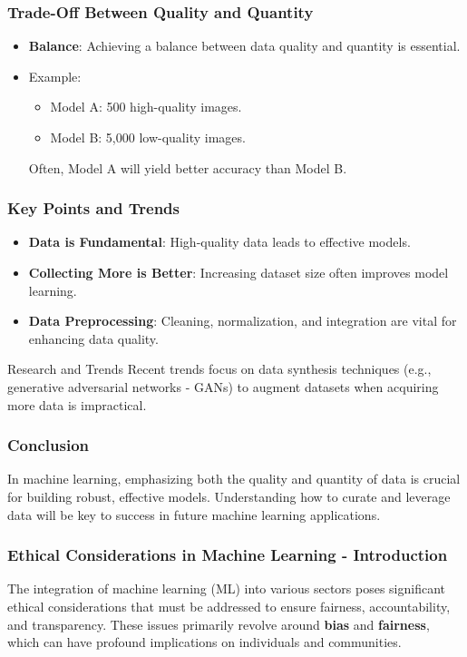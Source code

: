 \documentclass[aspectratio=169]{beamer}
\begin{document}
\begin{frame}[fragile]
    \frametitle{Trade-Off Between Quality and Quantity}
    \begin{itemize}
        \item \textbf{Balance}: Achieving a balance between data quality and quantity is essential.
        \item Example:
            \begin{itemize}
                \item Model A: 500 high-quality images.
                \item Model B: 5,000 low-quality images.
            \end{itemize}
            Often, Model A will yield better accuracy than Model B.
    \end{itemize}
\end{frame}

\begin{frame}[fragile]
    \frametitle{Key Points and Trends}
    \begin{itemize}
        \item \textbf{Data is Fundamental}: High-quality data leads to effective models.
        \item \textbf{Collecting More is Better}: Increasing dataset size often improves model learning.
        \item \textbf{Data Preprocessing}: Cleaning, normalization, and integration are vital for enhancing data quality.
    \end{itemize}
    \begin{block}{Research and Trends}
        Recent trends focus on data synthesis techniques (e.g., generative adversarial networks - GANs) to augment datasets when acquiring more data is impractical.
    \end{block}
\end{frame}

\begin{frame}[fragile]
    \frametitle{Conclusion}
    In machine learning, emphasizing both the quality and quantity of data is crucial for building robust, effective models. 
    Understanding how to curate and leverage data will be key to success in future machine learning applications.
\end{frame}

\begin{frame}[fragile]
    \frametitle{Ethical Considerations in Machine Learning - Introduction}
    The integration of machine learning (ML) into various sectors poses significant ethical considerations that must be addressed to ensure fairness, accountability, and transparency. 
    These issues primarily revolve around \textbf{bias} and \textbf{fairness}, which can have profound implications on individuals and communities.
\end{frame}
\end{document}

